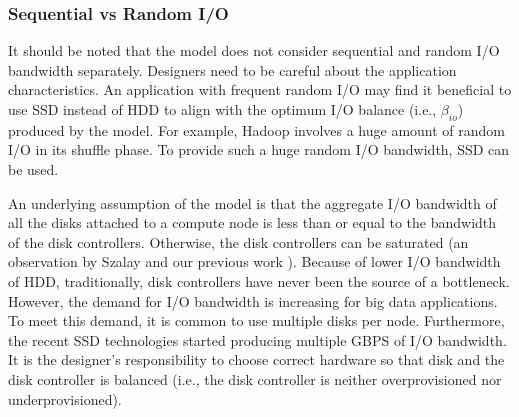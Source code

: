 \documentclass[journal]{IEEEtran}
\begin{document}
\subsubsection{Sequential vs Random I/O}
It should be noted that the model does not consider sequential and random I/O bandwidth separately. Designers need to be careful about the application characteristics. An application with frequent random I/O may find it beneficial to use SSD instead of HDD to align with the optimum I/O balance (i.e., $\beta_{io}$) produced by the model. For example, Hadoop involves a huge amount of random I/O  in its shuffle phase. To provide such a huge random I/O bandwidth, SSD can be used. 

An underlying assumption of the model is that the aggregate I/O bandwidth of all the disks attached to a compute node is less than or equal to the bandwidth of the disk controllers. Otherwise, the disk controllers can be saturated (an observation by Szalay \cite{cluster:AmdahlBalancedBlade} and our previous work \cite{scaleupscaleout:das2015evaluating}). Because of lower I/O bandwidth of HDD, traditionally, disk controllers have never been the source of a bottleneck. However, the demand for I/O bandwidth is increasing for big data applications. To meet this demand, it is common to  use multiple disks per node. Furthermore, the recent SSD technologies started producing multiple GBPS of I/O bandwidth. It is the designer's responsibility to choose correct hardware so that disk and the disk controller is balanced (i.e., the disk controller is neither overprovisioned nor underprovisioned). 
\end{document}
